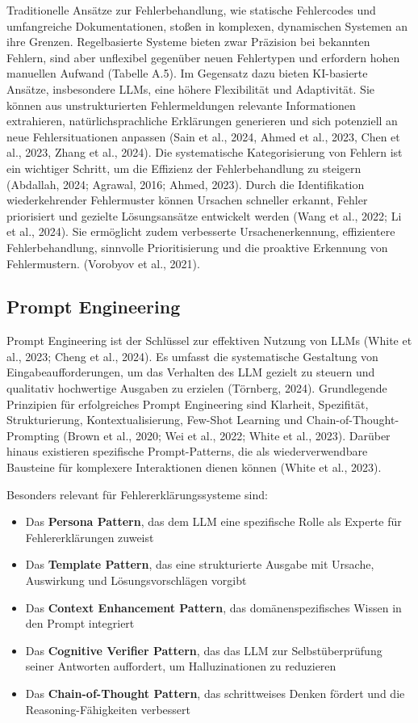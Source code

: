 \documentclass[
  a4paper,
  12pt,
  oneside,
  open=any,
  BCOR=12mm,
  DIV=14,
  parskip=half*,
  headsepline,
  footsepline,
  pointlessnumbers,
  liststotoc,
  numbers=noenddot,
  listof=totoc]{scrartcl}
\begin{document}
Traditionelle Ansätze zur Fehlerbehandlung, wie statische Fehlercodes
und umfangreiche Dokumentationen, stoßen in komplexen, dynamischen
Systemen an ihre Grenzen. Regelbasierte Systeme bieten zwar Präzision
bei bekannten Fehlern, sind aber unflexibel gegenüber neuen Fehlertypen
und erfordern hohen manuellen Aufwand (Tabelle A.5). Im Gegensatz dazu
bieten KI-basierte Ansätze, insbesondere LLMs, eine höhere Flexibilität
und Adaptivität. Sie können aus unstrukturierten Fehlermeldungen
relevante Informationen extrahieren, natürlichsprachliche Erklärungen
generieren und sich potenziell an neue Fehlersituationen anpassen (Sain
et al., 2024, Ahmed et al., 2023, Chen et al., 2023, Zhang et al.,
2024). Die systematische Kategorisierung von Fehlern ist ein wichtiger
Schritt, um die Effizienz der Fehlerbehandlung zu steigern (Abdallah,
2024; Agrawal, 2016; Ahmed, 2023). Durch die Identifikation
wiederkehrender Fehlermuster können Ursachen schneller erkannt, Fehler
priorisiert und gezielte Lösungsansätze entwickelt werden (Wang et al.,
2022; Li et al., 2024). Sie ermöglicht zudem verbesserte
Ursachenerkennung, effizientere Fehlerbehandlung, sinnvolle
Prioritisierung und die proaktive Erkennung von Fehlermustern. (Vorobyov
et al., 2021).

\subsection{Prompt Engineering}\label{prompt-engineering}

Prompt Engineering ist der Schlüssel zur effektiven Nutzung von LLMs
(White et al., 2023; Cheng et al., 2024). Es umfasst die systematische
Gestaltung von Eingabeaufforderungen, um das Verhalten des LLM gezielt
zu steuern und qualitativ hochwertige Ausgaben zu erzielen (Törnberg,
2024). Grundlegende Prinzipien für erfolgreiches Prompt Engineering sind
Klarheit, Spezifität, Strukturierung, Kontextualisierung, Few-Shot
Learning und Chain-of-Thought-Prompting (Brown et al., 2020; Wei et al.,
2022; White et al., 2023). Darüber hinaus existieren spezifische
Prompt-Patterns, die als wiederverwendbare Bausteine für komplexere
Interaktionen dienen können (White et al., 2023).

Besonders relevant für Fehlererklärungssysteme sind:

\begin{itemize}
\item
  Das \textbf{Persona Pattern}, das dem LLM eine spezifische Rolle als
  Experte für Fehlererklärungen zuweist
\item
  Das \textbf{Template Pattern}, das eine strukturierte Ausgabe mit
  Ursache, Auswirkung und Lösungsvorschlägen vorgibt
\item
  Das \textbf{Context Enhancement Pattern}, das domänenspezifisches
  Wissen in den Prompt integriert
\item
  Das \textbf{Cognitive Verifier Pattern}, das das LLM zur
  Selbstüberprüfung seiner Antworten auffordert, um Halluzinationen zu
  reduzieren
\item
  Das \textbf{Chain-of-Thought Pattern}, das schrittweises Denken
  fördert und die Reasoning-Fähigkeiten verbessert
\end{itemize}
\end{document}

